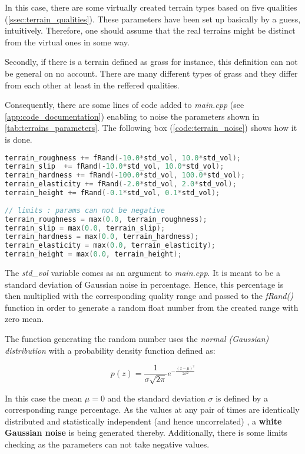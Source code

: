In this case, there are some virtually created terrain types based on five qualities (\cref{ssec:terrain_qualities}). These parameters have been set up basically by a guess, intuitively. Therefore, one should assume that the real terrains might be distinct from the virtual ones in some way.

Secondly, if there is a terrain defined as grass for instance, this definition can not be general on no account. There are many different types of grass and they differ from each other at least in the reffered qualities.

Consequently, there are some lines of code added to \textit{main.cpp} (see \ref{app:code_documentation}) enabling to noise the parameters shown in \cref{tab:terrains_parameters}. The following box (\ref{code:terrain_noise}) shows how it is done. 

\begin{lstlisting}[language=C++, caption={Adding terrain noise in main.cpp}, label=code:terrain_noise]
terrain_roughness += fRand(-10.0*std_vol, 10.0*std_vol);
terrain_slip  += fRand(-10.0*std_vol, 10.0*std_vol);
terrain_hardness += fRand(-100.0*std_vol, 100.0*std_vol);
terrain_elasticity += fRand(-2.0*std_vol, 2.0*std_vol);
terrain_height += fRand(-0.1*std_vol, 0.1*std_vol);
    
// limits : params can not be negative
terrain_roughness = max(0.0, terrain_roughness);
terrain_slip = max(0.0, terrain_slip);
terrain_hardness = max(0.0, terrain_hardness);
terrain_elasticity = max(0.0, terrain_elasticity);
terrain_height = max(0.0, terrain_height);
\end{lstlisting}

The \textit{std\_vol} variable comes as an argument to \textit{main.cpp}. It is meant to be a standard deviation of Gaussian noise in percentage. Hence, this percentage is then multiplied with the corresponding quality range and passed to the \textit{fRand()} function in order to generate a random float number from the created range with zero mean.

The function generating the random number uses the \textit{normal (Gaussian) distribution} with a probability density function defined as:

\begin{equation} \label{eq:gaussian_distribution}
p(z) = \frac{1}{\sigma \sqrt{2 \pi}} e^{- \frac{(z-\mu)^2}{2 \sigma^2}}
\end{equation}

In this case the mean $ \mu = 0 $ and the standard deviation $ \sigma $ is defined by a corresponding range percentage. As the values at any pair of times are identically distributed and statistically independent (and hence uncorrelated) \citep{misc:wiki}, a \textbf{white Gaussian noise} is being generated thereby. Additionally, there is some limits checking as the parameters can not take negative values.

